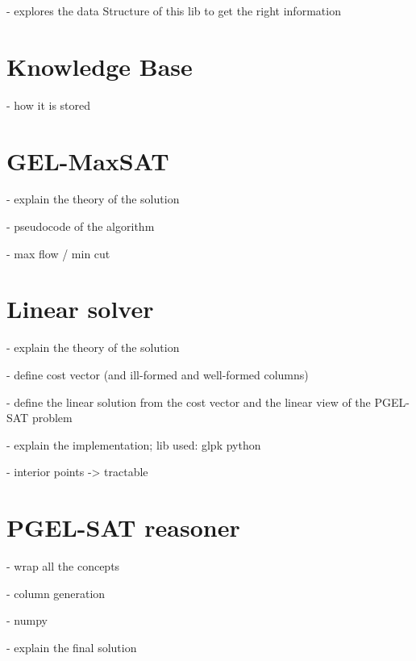- explores the data Structure of this lib to get the right information

\section{Knowledge Base}
- how it is stored


\section{GEL-MaxSAT}
- explain the theory of the solution

- pseudocode of the algorithm 

- max flow / min cut

\section{Linear solver}
- explain the theory of the solution

  - define cost vector (and ill-formed and well-formed columns)
  
  - define the linear solution from the cost vector and the linear view of the PGEL-SAT problem

- explain the implementation; lib used: glpk python

- interior points -> tractable

\section{PGEL-SAT reasoner}
- wrap all the concepts

- column generation

- numpy

- explain the final solution
